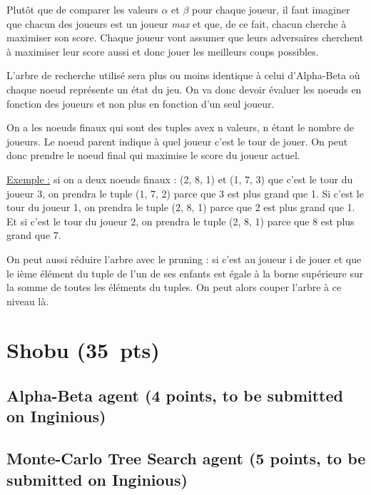 \documentclass[11pt,a4paper]{report}
\begin{document}
\begin{answers}[9cm]
Plutôt que de comparer les valeurs $\alpha$ et $\beta$ pour chaque joueur, il faut imaginer que chacun des joueurs est un joueur \textit{max} et que, de ce fait, chacun cherche à maximiser son score. Chaque joueur vont assumer que leurs adversaires cherchent à maximiser leur score aussi et donc jouer les meilleurs coups possibles.

L'arbre de recherche utilisé sera plus ou moins identique à celui d'Alpha-Beta où chaque noeud représente un état du jeu. On va donc devoir évaluer les noeuds en fonction des joueurs et non plus en fonction d'un seul joueur.

On a les noeuds finaux qui sont des tuples avex n valeurs, n étant le nombre de joueurs. Le noeud parent indique à quel joueur c'est le tour de jouer. On peut donc prendre le noeud final qui maximise le score du joueur actuel.

\underline{Exemple :} si on a deux noeuds finaux : (2, 8, 1) et (1, 7, 3) que c'est le tour du joueur 3, on prendra le tuple (1, 7, 2) parce que 3 est plus grand que 1. Si c'est le tour du joueur 1, on prendra le tuple (2, 8, 1) parce que 2 est plus grand que 1. Et si c'est le tour du joueur 2, on prendra le tuple (2, 8, 1) parce que 8 est plus grand que 7.

On peut aussi réduire l'arbre avec le pruning : si c'est au joueur i de jouer et que le ième élément du tuple de l'un de ses enfants est égale à la borne supérieure sur la somme de toutes les éléments du tuples. On peut alors couper l'arbre à ce niveau là.
\end{answers}





\clearpage
\section{Shobu (35~pts)}
\medskip

\subsection{Alpha-Beta agent (4 points, to be submitted on Inginious)}
\medskip


\subsection{Monte-Carlo Tree Search agent (5 points, to be submitted on Inginious)}
\medskip
\end{document}
